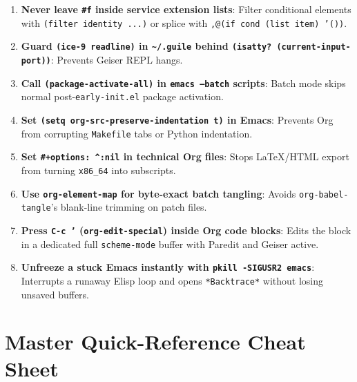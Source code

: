 \documentclass[11pt,oneside]{book}
\begin{document}
\begin{enumerate}[leftmargin=1.8em,itemsep=2pt]
  \item \textbf{Never leave \texttt{\#f} inside service extension lists}: Filter conditional elements with \texttt{(filter identity ...)} or splice with \texttt{,@(if cond (list item) '())}.
  \item \textbf{Guard \texttt{(ice-9 readline)} in \texttt{\textasciitilde/.guile} behind \texttt{(isatty? (current-input-port))}}: Prevents Geiser REPL hangs.
  \item \textbf{Call \texttt{(package-activate-all)} in \texttt{emacs --batch} scripts}: Batch mode skips normal post-\texttt{early-init.el} package activation.
  \item \textbf{Set \texttt{(setq org-src-preserve-indentation t)} in Emacs}: Prevents Org from corrupting \texttt{Makefile} tabs or Python indentation.
  \item \textbf{Set \texttt{\#+options: \textasciicircum:nil} in technical Org files}: Stops LaTeX/HTML export from turning \texttt{x86\_64} into subscripts.
  \item \textbf{Use \texttt{org-element-map} for byte-exact batch tangling}: Avoids \texttt{org-babel-tangle}'s blank-line trimming on patch files.
  \item \textbf{Press \texttt{C-c '} (\texttt{org-edit-special}) inside Org code blocks}: Edits the block in a dedicated full \texttt{scheme-mode} buffer with Paredit and Geiser active.
  \item \textbf{Unfreeze a stuck Emacs instantly with \texttt{pkill -SIGUSR2 emacs}}: Interrupts a runaway Elisp loop and opens \texttt{*Backtrace*} without losing unsaved buffers.
\end{enumerate}

\section{Master Quick-Reference Cheat Sheet}
\end{document}
